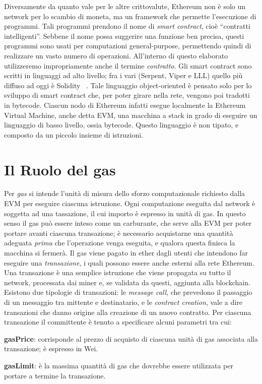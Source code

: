 \indent Diversamente da quanto vale per le altre crittovalute, Ethereum non è solo un network per lo scambio di moneta, ma un framework che permette l'esecuzione di programmi. Tali programmi prendono il nome di \textit{smart contract}, cioè ``contratti intelligenti''. Sebbene il nome possa suggerire una funzione ben precisa, questi programmi sono usati per computazioni general-purpose, permettendo quindi di realizzare un vasto numero di operazioni. All'interno di questo elaborato utilizzeremo impropriamente anche il termine \textit{contratto}.\newline
\indent Gli smart contract sono scritti in linguaggi ad alto livello; fra i vari (Serpent, Viper e LLL) quello più diffuso ad oggi è Solidity ~\cite{ethereum/solidity_2019}.  Tale linguaggio object-oriented è pensato solo per lo sviluppo di smart contract che, per poter girare nella rete, vengono poi tradotti in bytecode. Ciascun nodo di Ethereum infatti esegue localmente la Ethereum Virtual Machine, anche detta EVM, una macchina a stack in grado di eseguire un linguaggio di basso livello, ossia bytecode. Questo linguaggio è non tipato, e composto da un piccolo insieme di istruzioni.\newline 

\section{Il Ruolo del gas}

Per \textit{gas} si intende l'unità di misura dello sforzo computazionale richiesto dalla EVM per eseguire ciascuna istruzione. Ogni computazione eseguita dal network è 
soggetta ad una tassazione, il cui importo è espresso in
unità di gas. In questo senso il gas può essere inteso come
un carburante, che serve alla EVM per poter portare avanti ciascuna transazione; è necessario acquistarne una quantità adeguata \textit{prima} che l'operazione venga eseguita, e qualora questa finisca la macchina si fermerà.\newline
\indent Il gas viene pagato in ether dagli utenti che intendono far eseguire una \textit{transazione}, i quali possono essere anche esterni alla rete Ethereum. Una transazione è una semplice istruzione che viene propagata su tutto il network, processata dai miner e, se validata da questi, aggiunta alla blockchain. Esistono due tipologie di transazioni: le \textit{message call}, che prevedono il passaggio di un messaggio tra mittente e destinatario, e le \textit{contract creation}, vale a dire transazioni che danno origine alla creazione di un nuovo contratto. Per ciascuna transazione il committente è tenuto a specificare alcuni parametri tra cui:
\begin{description}
 \item \textbf{gasPrice}: corrisponde al prezzo di acquisto di ciascuna unità di gas associata alla transazione; è espresso in Wei.
 \item \textbf{gasLimit}: è la massima quantità di gas che dovrebbe essere utilizzata per portare a termine la transazione.
\end{description}

